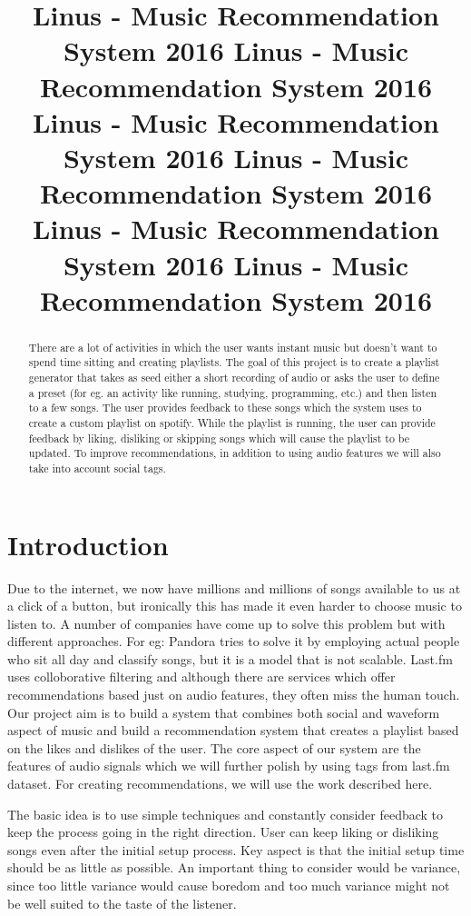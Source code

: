 \documentclass{article}
\title{Linus - Music Recommendation System 2016}
\title{ Linus - Music Recommendation System 2016}
\title{ Linus - Music Recommendation System 2016}
\title{ Linus - Music Recommendation System 2016}
\title{ Linus - Music Recommendation System 2016}
\title{ Linus - Music Recommendation System 2016}
\begin{document}
%
\maketitle
%
\begin{abstract}
There are a lot of activities in which the user wants instant music but doesn't want to spend time sitting and creating playlists. The goal of this project is to create a playlist generator that takes as seed either a short recording of audio or asks the user to define a preset (for eg. an activity like running, studying, programming, etc.) and then listen to a few songs. The user provides feedback to these songs which the system uses to create a custom playlist on spotify. While the playlist is running, the user can provide feedback by liking, disliking or skipping songs which will cause the playlist to be updated. To improve recommendations, in addition to using audio features we will also take into account social tags.\cite{Turnbull08fiveapproaches}
\end{abstract}
%
\section{Introduction}

Due to the internet, we now have millions and millions of songs available to us at a click of a button, but ironically this has made it even harder to choose music to listen to. A number of companies have come up to solve this problem but with different approaches. For eg: Pandora tries to solve it by employing actual people who sit all day and classify songs, but it is a model that is not scalable. Last.fm uses colloborative filtering and although there are services which offer recommendations based just on audio features, they often miss the human touch. Our project aim is to build a system that combines both social and waveform aspect of music and build a recommendation system that creates a playlist based on the likes and dislikes of the user. The core aspect of our system are the features of audio signals which we will further polish by using tags from last.fm dataset. For creating recommendations, we will use the work described here.\cite{Tim05dynamicplaylist}

The basic idea is to use simple techniques and constantly consider feedback to keep the process going in the right direction. User can keep liking or disliking songs even after the initial setup process.  Key aspect is that the initial setup time should be as little as possible.  An important thing to consider would be variance, since too little variance would cause boredom and too much variance might not be well suited to the taste of the listener.
\end{document}
